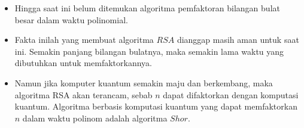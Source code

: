 \documentclass{article}
\begin{document}

\begin{itemize}
  \item Hingga saat ini belum ditemukan algoritma pemfaktoran bilangan bulat besar dalam waktu polinomial.
  \item Fakta inilah yang membuat algoritma $RSA$ dianggap masih aman untuk saat ini. Semakin panjang bilangan bulatnya, maka semakin lama waktu yang dibutuhkan untuk memfaktorkannya.
  \item Namun jika komputer kuantum semakin maju dan berkembang, maka algoritma RSA akan terancam, sebab $n$ dapat difaktorkan dengan komputasi kuantum. Algoritma berbasis komputasi kuantum yang dapat memfaktorkan $n$ dalam waktu polinom adalah algoritma $Shor$.
\end{itemize}
\end{document}

